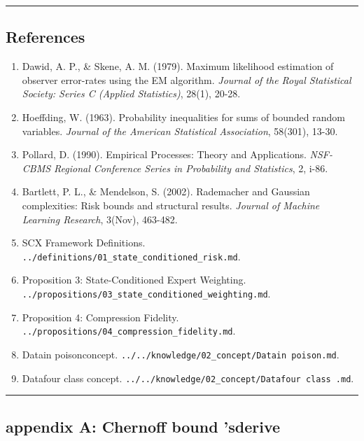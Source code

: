 \documentclass[
  12pt,
]{article}
\begin{document}
\begin{center}\rule{0.5\linewidth}{0.5pt}\end{center}

\subsection{References}\label{ux53c2ux8003ux6587ux732e}

\begin{enumerate}
\def\labelenumi{\arabic{enumi}.}
\item
  Dawid, A. P., \& Skene, A. M. (1979). Maximum likelihood estimation of
  observer error-rates using the EM algorithm. \emph{Journal of the
  Royal Statistical Society: Series C (Applied Statistics)}, 28(1),
  20-28.
\item
  Hoeffding, W. (1963). Probability inequalities for sums of bounded
  random variables. \emph{Journal of the American Statistical
  Association}, 58(301), 13-30.
\item
  Pollard, D. (1990). Empirical Processes: Theory and Applications.
  \emph{NSF-CBMS Regional Conference Series in Probability and
  Statistics}, 2, i-86.
\item
  Bartlett, P. L., \& Mendelson, S. (2002). Rademacher and Gaussian
  complexities: Risk bounds and structural results. \emph{Journal of
  Machine Learning Research}, 3(Nov), 463-482.
\item
  SCX Framework Definitions.
  \texttt{../definitions/01\_state\_conditioned\_risk.md}.
\item
  Proposition 3: State-Conditioned Expert Weighting.
  \texttt{../propositions/03\_state\_conditioned\_weighting.md}.
\item
  Proposition 4: Compression Fidelity.
  \texttt{../propositions/04\_compression\_fidelity.md}.
\item
  Datain poisonconcept. \texttt{../../knowledge/02\_concept/Datain poison.md}.
\item
  Datafour class concept. \texttt{../../knowledge/02\_concept/Datafour class .md}.
\end{enumerate}

\begin{center}\rule{0.5\linewidth}{0.5pt}\end{center}

\subsection{appendix A: Chernoff
bound 'sderive}\label{ux9644ux5f55-achernoff-ux754cux7684ux63a8ux5bfc}
\end{document}
